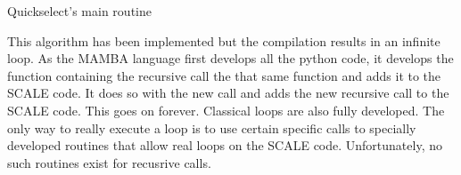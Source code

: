 \begin{center}
\begin{algorithm}[H]
 \DontPrintSemicolon
 \caption{Quickselect's main routine}
 \label{alg:knn-sq-2}
\end{algorithm}

This algorithm has been implemented but the compilation results in an infinite loop. As the MAMBA language first develops all the python code, it develops the function containing the recursive call the that same function and adds it to the SCALE code. It does so with the new call and adds the new recursive call to the SCALE code. This goes on forever. Classical loops are also fully developed. The only way to really execute a loop is to use certain specific calls to specially developed routines that allow real loops on the SCALE code. Unfortunately, no such routines exist for recusrive calls.

\end{center}